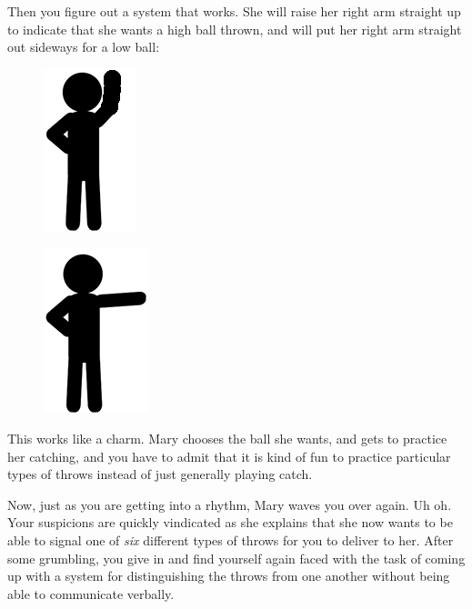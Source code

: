 \documentclass[UTF8]{book}
\begin{document}
\begin{CJK}{UTF8}{gbsn}
Then you figure out a system that works. She will raise her right arm straight up to indicate that she wants a high ball thrown, and will put her right arm straight out sideways for a low ball:

\begin{figure}[H]
\centering
\captionsetup{labelformat=empty}
\begin{minipage}{.4\textwidth}
  \centering
  \includegraphics[width=.3\linewidth]{stick-figure-arm-raised}
  \label{fig:test1}
\end{minipage}%
\begin{minipage}{.4\textwidth}
  \centering
  \includegraphics[width=.3\linewidth]{stick-figure-arm-sideways}
  \label{fig:test2}
\end{minipage}
\end{figure}

This works like a charm. Mary chooses the ball she wants, and gets to practice her catching, and you have to admit that it is kind of fun to practice particular types of throws instead of just generally playing catch.

Now, just as you are getting into a rhythm, Mary waves you over again. Uh oh. Your suspicions are quickly vindicated as she explains that she now wants to be able to signal one of \emph{six} different types of throws for you to deliver to her. After some grumbling, you give in and find yourself again faced with the task of coming up with a system for distinguishing the throws from one another without being able to communicate verbally.


\end{CJK}
\end{document}
